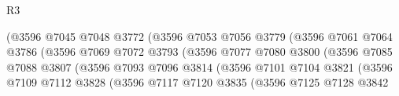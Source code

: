 \begin{lexlean}{R3}
\begin{coremodule}
                                          (@3596
                                            @7045
                                            @7048
                                            @3772
                                            (@3596
                                              @7053
                                              @7056
                                              @3779
                                              (@3596
                                                @7061
                                                @7064
                                                @3786
                                                (@3596
                                                  @7069
                                                  @7072
                                                  @3793
                                                  (@3596
                                                    @7077
                                                    @7080
                                                    @3800
                                                    (@3596
                                                      @7085
                                                      @7088
                                                      @3807
                                                      (@3596
                                                        @7093
                                                        @7096
                                                        @3814
                                                        (@3596
                                                          @7101
                                                          @7104
                                                          @3821
                                                          (@3596
                                                            @7109
                                                            @7112
                                                            @3828
                                                            (@3596
                                                              @7117
                                                              @7120
                                                              @3835
                                                              (@3596
                                                                @7125
                                                                @7128
                                                                @3842

\end{coremodule}
\end{lexlean}
